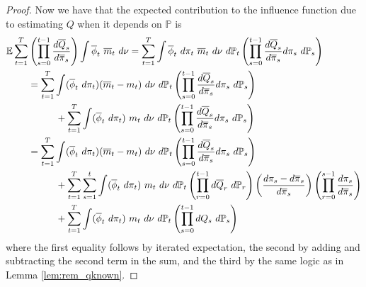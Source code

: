 \documentclass[12pt]{article}
\newcommand{\Pb}{\mathbb{P}}
\newcommand{\E}{\mathbb{E}}
\theoremstyle{remark}
\begin{document}
\begin{proof}
Now we have that the expected contribution to the influence function due to estimating $Q$ when it depends on $\Pb$ is
\begin{align*}
\E \sum_{t=1}^T &\left( \prod_{s=0}^{t-1}  \frac{ d\overline{Q}_s }{ d\overline\pi_s } \right) \int \overline\phi_t \ \overline{m}_t \ d\nu = \sum_{t=1}^T \int \overline\phi_t \ d\pi_t \ \overline{m}_t \ d\nu \ d\Pb_t \left( \prod_{s=0}^{t-1}  \frac{ d\overline{Q}_s }{ d\overline\pi_s } d\pi_s \ d\Pb_s \right) \\
&= \sum_{t=1}^T \int (\overline\phi_t \ d\pi_t) (\overline{m}_t - m_t) \ d\nu \ d\Pb_t \left( \prod_{s=0}^{t-1}  \frac{ d\overline{Q}_s }{ d\overline\pi_s } d\pi_s \ d\Pb_s \right) \\
& \hspace{.4in} + \sum_{t=1}^T \int (\overline\phi_t \ d\pi_t) \ m_t \ d\nu \ d\Pb_t \left( \prod_{s=0}^{t-1}  \frac{ d\overline{Q}_s }{ d\overline\pi_s } d\pi_s \ d\Pb_s \right) \\
&= \sum_{t=1}^T \int (\overline\phi_t \ d\pi_t) (\overline{m}_t - m_t) \ d\nu \ d\Pb_t \left( \prod_{s=0}^{t-1}  \frac{ d\overline{Q}_s }{ d\overline\pi_s } d\pi_s \ d\Pb_s \right) \\
& \hspace{.4in} + \sum_{t=1}^T \sum_{s=1}^t \int (\overline\phi_t \ d\pi_t) \ m_t \ d\nu \ d\Pb_t \left( \prod_{r=0}^{t-1} d\overline{Q}_r \ d\Pb_r \right) \left( \frac{d\pi_s-d\overline\pi_s}{d\overline\pi_s} \right)  \left( \prod_{r=0}^{s-1}  \frac{ d\pi_s }{ d\overline\pi_s } \right) \\
&\hspace{.4in} +  \sum_{t=1}^T \int (\overline\phi_t \ d\pi_t) \ m_t \ d\nu \ d\Pb_t \left( \prod_{s=0}^{t-1} dQ_s  \ d\Pb_s \right)
\end{align*}
where the first equality follows by iterated expectation, the second by adding and subtracting the second term in the sum, and the third %
by the same logic as in Lemma \ref{lem:rem_qknown}.


\end{proof}
\end{document}
